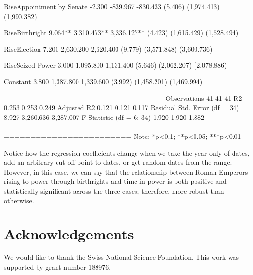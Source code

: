 \documentclass[
]{jss}
\begin{document}
\begin{CodeChunk}
\begin{CodeOutput}
RiseAppointment by Senate             -2.300    -839.967    -830.433  
                                     (5.406)   (1,974.413) (1,990.382)
                                                                      
RiseBirthright                       9.064**   3,310.473** 3,336.127**
                                     (4.423)   (1,615.429) (1,628.494)
                                                                      
RiseElection                          7.200     2,630.200   2,620.400 
                                     (9.779)   (3,571.848) (3,600.736)
                                                                      
RiseSeized Power                      3.000     1,095.800   1,131.400 
                                     (5.646)   (2,062.207) (2,078.886)
                                                                      
Constant                              3.800     1,387.800   1,339.600 
                                     (3.992)   (1,458.201) (1,469.994)
                                                                      
----------------------------------------------------------------------
Observations                            41         41          41     
R2                                    0.253       0.253       0.249   
Adjusted R2                           0.121       0.121       0.117   
Residual Std. Error (df = 34)         8.927     3,260.636   3,287.007 
F Statistic (df = 6; 34)              1.920       1.920       1.882   
======================================================================
Note:                                      *p<0.1; **p<0.05; ***p<0.01
\end{CodeOutput}
\end{CodeChunk}

Notice how the regression coefficients change when we take the year only
of dates, add an arbitrary cut off point to dates, or get random dates
from the range. However, in this case, we can say that the relationship
between Roman Emperors rising to power through birthrights and time in
power is both positive and statistically significant across the three
cases; therefore, more robust than otherwise.

\hypertarget{acknowledgements}{%
\section{Acknowledgements}\label{acknowledgements}}

We would like to thank the Swiss National Science Foundation. This work
was supported by grant number 188976.

\renewcommand\refname{References}

\end{document}
